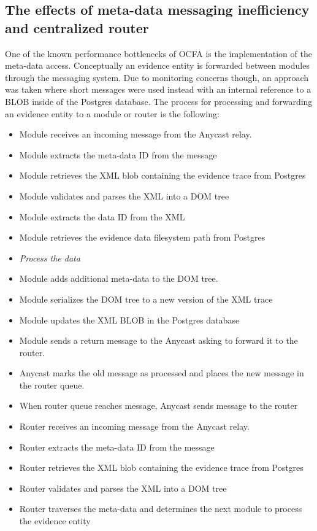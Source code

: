 \subsection{The effects of meta-data messaging inefficiency and centralized router}
One of the known performance bottlenecks of OCFA is the implementation of the meta-data access. Conceptually an evidence entity is forwarded between modules through the messaging system. Due to monitoring concerns though, an approach was taken where short messages were used instead with an internal reference to a BLOB inside of the Postgres database. The process for processing and forwarding an evidence entity to a module or router is the following:
\begin{itemize}
\item Module receives an incoming message from the Anycast relay.
\item Module extracts the meta-data ID from the message
\item Module retrieves the XML blob containing the evidence trace from Postgres
\item Module validates and parses the XML into a DOM tree
\item Module extracts the data ID from the XML
\item Module retrieves the evidence data filesystem path from Postgres
\item \emph{Process the data}
\item Module adds additional meta-data to the DOM tree.
\item Module serializes the DOM tree to a new version of the XML trace
\item Module updates the XML BLOB in the Postgres database
\item Module sends a return message to the Anycast asking to forward it to the router.
\item Anycast marks the old message as processed and places the new message in the router queue.
\item When router queue reaches message, Anycast sends message to the router
\item Router receives an incoming message from the Anycast relay.
\item Router extracts the meta-data ID from the message
\item Router retrieves the XML blob containing the evidence trace from Postgres
\item Router validates and parses the XML into a DOM tree
\item Router traverses the meta-data and determines the next module to process the evidence entity

\end{itemize}
